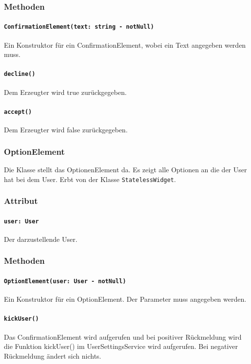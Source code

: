 \documentclass[parskip=full]{scrartcl}
\begin{document}
        \subsubsection*{Methoden}
            \paragraph*{\texttt{ConfirmationElement(text: string - notNull)}} Ein Konstruktor für ein ConfirmationElement, wobei ein Text angegeben werden muss.
            \paragraph*{\texttt{decline()}} Dem Erzeugter wird true zurückgegeben.
            \paragraph*{\texttt{accept()}} Dem Erzeugter wird false zurückgegeben.


    \subsubsection{OptionElement}
        Die Klasse stellt das OptionenElement da. Es zeigt alle Optionen an die der User hat bei dem User. Erbt von der Klasse \texttt{StatelessWidget}.
        \subsubsection*{Attribut}
            \paragraph*{\texttt{user: User}} Der darzustellende User.

        \subsubsection*{Methoden}
            \paragraph*{\texttt{OptionElement(user: User - notNull)}} Ein Konstruktor für ein OptionElement. Der Parameter muss angegeben werden. 
            \paragraph*{\texttt{kickUser()}} Das ConfirmationElement wird aufgerufen und bei positiver Rückmeldung wird die Funktion kickUser() im UserSettingsService wird aufgerufen. Bei negativer Rückmeldung ändert sich nichts.
\end{document}
